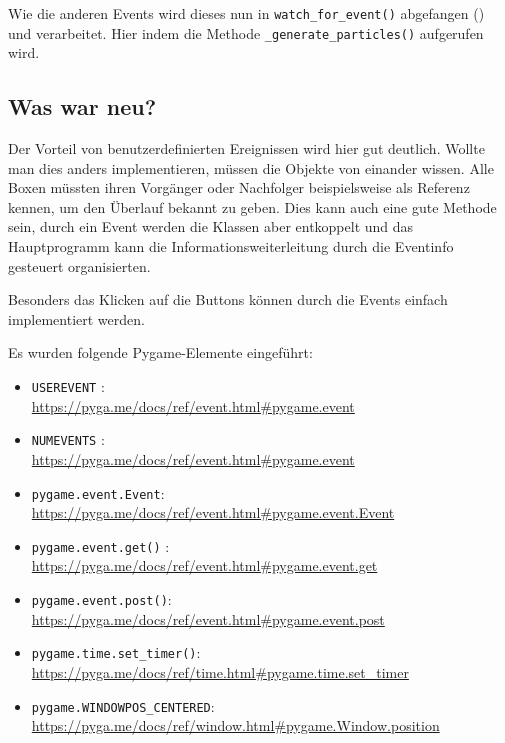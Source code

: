 Wie die anderen Events wird dieses nun in \texttt{watch\_for\_event()} abgefangen () und verarbeitet. Hier indem die Methode \texttt{\_generate\_particles()} aufgerufen wird.


\subsection*{Was war neu?}

Der Vorteil von benutzerdefinierten Ereignissen wird hier gut deutlich. Wollte man dies anders implementieren, müssen die Objekte von einander wissen. Alle Boxen müssten ihren Vorgänger oder Nachfolger beispielsweise als Referenz kennen, um den Überlauf bekannt zu geben. Dies kann auch eine gute Methode sein, durch ein Event werden die Klassen aber entkoppelt und das Hauptprogramm kann die Informationsweiterleitung durch die Eventinfo gesteuert organisierten.

Besonders das Klicken auf die Buttons können durch die Events einfach implementiert werden.


Es wurden folgende Pygame-Elemente eingeführt:

\begin{itemize}
	\item \texttt{USEREVENT}
    :\\
    \url{https://pyga.me/docs/ref/event.html#pygame.event}

    \item \texttt{NUMEVENTS}
    :\\
    \url{https://pyga.me/docs/ref/event.html#pygame.event}

	\item \texttt{pygame.event.Event}:
	\\
	\url{https://pyga.me/docs/ref/event.html#pygame.event.Event}
	
	\item \texttt{pygame.event.get()}
    :\\
    \url{https://pyga.me/docs/ref/event.html#pygame.event.get}

	\item \texttt{pygame.event.post()}:
	\\
	\url{https://pyga.me/docs/ref/event.html#pygame.event.post}
	
	\item \texttt{pygame.time.set\_timer()}:
	\\
	\url{https://pyga.me/docs/ref/time.html#pygame.time.set_timer}

	\item \texttt{pygame.WINDOWPOS\_CENTERED}:
	\\
	\url{https://pyga.me/docs/ref/window.html#pygame.Window.position}

	
\end{itemize}


